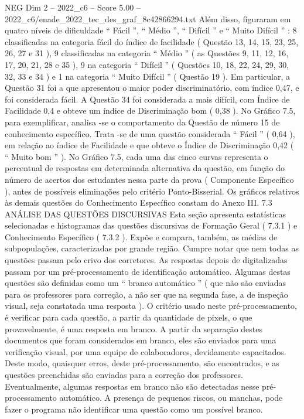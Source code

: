 \begin{textsample}{NEG Dim 2 – 2022\_c6 – Score 5.00 – 2022\_c6/enade\_2022\_tec\_des\_graf\_8c42866294.txt}
Além disso, figuraram em quatro níveis de dificuldade “ Fácil ”, “ Médio ”, “ Difícil ” e “ Muito Difícil ” : 8 classificadas na categoria fácil do índice de facilidade ( Questão 13, 14, 15, 23, 25, 26, 27 e 31 ), 9 classificadas na categoria “ Médio ” ( as Questões 9, 11, 12, 16, 17, 20, 21, 28 e 35 ), 9 na categoria “ Difícil ” ( Questões 10, 18, 22, 24, 29, 30, 32, 33 e 34 ) e 1 na categoria “ Muito Difícil ” ( Questão 19 ).
Em particular, a Questão 31 foi a que apresentou o maior poder discriminatório, com índice 0,47, e foi considerada fácil.
A Questão 34 foi considerada a mais difícil, com Índice de Facilidade 0,4 e obteve um índice de Discriminação bom ( 0,38 ).
No Gráfico 7.5, para exemplificar, analisa -se o comportamento da Questão de número 15 de conhecimento específico.
Trata -se de uma questão considerada “ Fácil ” ( 0,64 ), em relação ao índice de Facilidade e que obteve o Índice de Discriminação 0,42 ( “ Muito bom ” ).
No Gráfico 7.5, cada uma das cinco curvas representa o percentual de respostas em determinada alternativa da questão, em função do número de acertos dos estudantes nessa parte da prova ( Componente Específico ), antes de possíveis eliminações pelo critério Ponto-Bisserial.
Os gráficos relativos às demais questões do Conhecimento Específico constam do Anexo III. 7.3 ANÁLISE DAS QUESTÕES DISCURSIVAS Esta seção apresenta estatísticas selecionadas e histogramas das questões discursivas de Formação Geral ( 7.3.1 ) e Conhecimento Específico ( 7.3.2 ).
Expõe e compara, também, as médias de subpopulações, caracterizadas por grande região.
Cumpre notar que nem todas as questões passam pelo crivo dos corretores.
As respostas depois de digitalizadas passam por um pré-processamento de identificação automático.
Algumas destas questões são definidas como um “ branco automático ” ( que não são enviadas para os professores para correção, a não ser que na segunda fase, a de inspeção visual, seja constatada uma resposta ).
O critério usado neste pré-processamento, é verificar para cada questão, a partir da quantidade de pixels, o que provavelmente, é uma resposta em branco.
A partir da separação destes documentos que foram considerados em branco, eles são enviados para uma verificação visual, por uma equipe de colaboradores, devidamente capacitados.
Deste modo, quaisquer erros, deste pré-processamento, são encontrados, e as questões preenchidas são enviadas para a correção dos professores.
Eventualmente, algumas respostas em branco não são detectadas nesse pré-processamento automático.
A presença de pequenos riscos, ou manchas, pode fazer o programa não identificar uma questão como um possível branco.

\end{textsample}
